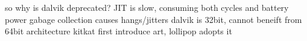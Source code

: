 




so why is dalvik deprecated?
JIT is slow, consuming both cycles and battery power
gabage collection causes hangs/jitters
dalvik is 32bit, cannot beneift from 64bit architecture
kitkat first introduce art, lollipop adopts it
